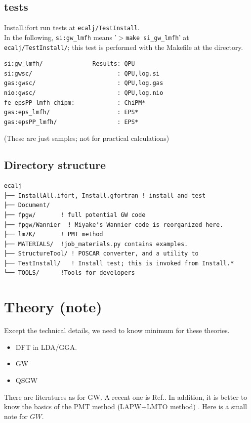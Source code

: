 \documentclass[a4paper,10pt,epsf,fleqn]{article}
\begin{document}
\subsection{tests}
Install.ifort run tests at \verb#ecalj/TestInstall#.\\
In the following, \verb#si:gw_lmfh# means '$>$\verb#make si_gw_lmfh#'
at \verb#ecalj/TestInstall/#; this test is performed with the Makefile
at the directory. 
\begin{verbatim}
si:gw_lmfh/              Results: QPU 
si:gwsc/                        : QPU,log.si
gas:gwsc/                       : QPU,log.gas
nio:gwsc/                       : QPU,log.nio
fe_epsPP_lmfh_chipm:            : ChiPM* 
gas:eps_lmfh/                   : EPS*
gas:epsPP_lmfh/                 : EPS*
\end{verbatim}
(These are just samples; not for practical calculations)

\subsection{Directory structure}
{\baselineskip=1mm
\begin{verbatim}
ecalj
├── InstallAll.ifort, Install.gfortran ! install and test
├── Document/
├── fpgw/       ! full potential GW code
├── fpgw/Wannier  ! Miyake's Wannier code is reorganized here.
├── lm7K/       ! PMT method 
├── MATERIALS/  !job_materials.py contains examples. 
├── StructureTool/ ! POSCAR converter, and a utility to 
├── TestInstall/   ! Install test; this is invoked from Install.*
└── TOOLS/      !Tools for developers
\end{verbatim}
}


\newpage
\section{Theory (note)}
Except the technical details, we need to know minimum for these theories.
\begin{itemize}
\item DFT in LDA/GGA.
\item GW
\item QSGW
\end{itemize}
There are literatures as for GW. A recent one is 
Ref.\cite{di_valentin_quasiparticle_2014}.
In addition, it is better to know the basics of the PMT
method (LAPW+LMTO method)
\cite{kotani2015pmt}. 
Here is a small note for $GW$.\\
\end{document}
